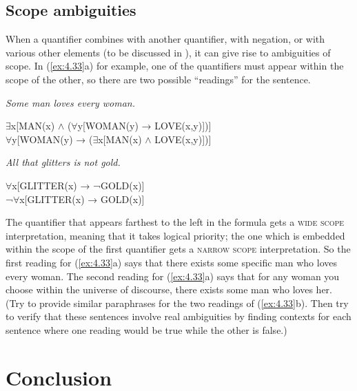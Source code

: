 \subsection{Scope ambiguities}\label{sec:} %

When a quantifier combines with another quantifier, with negation, or with various other elements (to be discussed in ), it can give rise to ambiguities of scope. In (\ref{ex:4.33}a) for example, one of the quantifiers must appear within the scope of the other, so there are two possible “readings” for the sentence.


\ea \label{ex:4.33}
\ea \textit{Some man loves every woman.}\\
  \begin{xlisti} 
      \ex ${\exists}$x[MAN(x) $\wedge$ (${\forall}$y[WOMAN(y) → LOVE(x,y)])]\\
      \ex ${\forall}$y[WOMAN(y) → (${\exists}$x[MAN(x) $\wedge$ LOVE(x,y)])]
  \end{xlisti} 
\ex  \textit{All that glitters is not gold.}\\
  \begin{xlisti}
  \ex ${\forall}$x[GLITTER(x) → ¬GOLD(x)]\\
  \ex ¬${\forall}$x[GLITTER(x) → GOLD(x)]
  \end{xlisti}
\z \z


The quantifier that appears farthest to the left in the formula gets a \textsc{wide scope} interpretation, meaning that it takes logical priority; the one which is embedded within the scope of the first quantifier gets a \textsc{narrow scope} interpretation. So the first reading for (\ref{ex:4.33}a) says that there exists some specific man who loves every woman. The second reading for (\ref{ex:4.33}a) says that for any woman you choose within the universe of discourse, there exists some man who loves her. (Try to provide similar paraphrases for the two readings of (\ref{ex:4.33}b). Then try to verify that these sentences involve real ambiguities by finding contexts for each sentence where one reading would be true while the other is false.)


\section{Conclusion}\label{sec:} %

